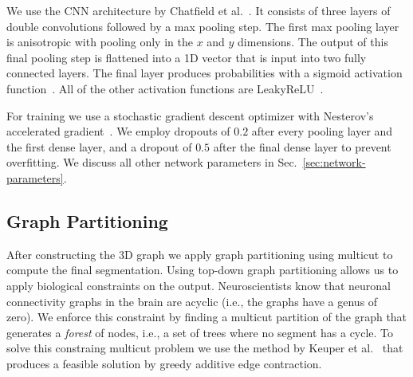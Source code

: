 We use the CNN architecture by Chatfield et al.~\cite{chatfield2014return}. It consists of three layers of double convolutions followed by a max pooling step. The first max pooling layer is anisotropic with pooling only in the $x$ and $y$ dimensions. The output of this final pooling step is flattened into a 1D vector that is input into two fully connected layers. The final layer produces probabilities with a sigmoid activation function~\cite{funahashi1989approximate}. All of the other activation functions are LeakyReLU~\cite{maas2013rectifier}.

For training we use a stochastic gradient descent optimizer with Nesterov's accelerated gradient~\cite{nesterov1983method}. We employ dropouts of $0.2$ after every pooling layer and the first dense layer, and a dropout of $0.5$ after the final dense layer to prevent overfitting. We discuss all other network parameters in Sec.~\ref{sec:network-parameters}.


\subsection{Graph Partitioning}

After constructing the 3D graph we apply graph partitioning using multicut to compute the final segmentation. Using top-down graph partitioning allows us to apply biological constraints on the output. Neuroscientists know that neuronal connectivity graphs in the brain are acyclic (i.e., the graphs have a genus of zero). We enforce this constraint by finding a multicut partition of the graph that generates a \textit{forest} of nodes, i.e., a set of trees where no segment has a cycle. To solve this constraing multicut problem we use the method by Keuper et al.~\cite{keuper2015efficient} that produces a feasible solution by greedy additive edge contraction. 
